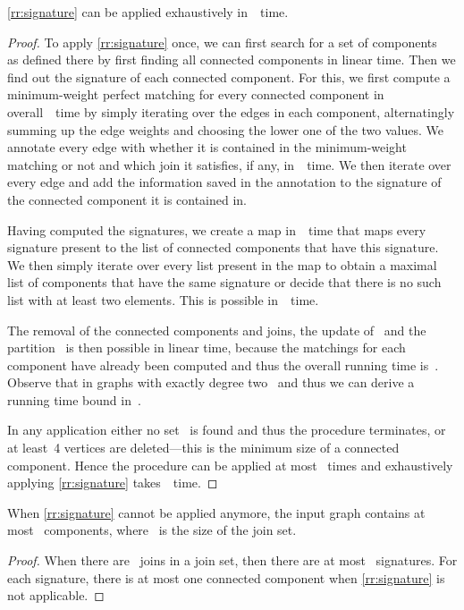 \begin{lemma}\label{lem:signatureruntime}
  \autoref{rr:signature} can be applied exhaustively in~~time.
\end{lemma}
\begin{proof}
  To apply \autoref{rr:signature} once, we can first search for a set of components~ as defined there by first finding all connected components in linear time. Then we find out the signature of each connected component. For this, we first compute a minimum-weight perfect matching for every connected component in overall~~time by simply iterating over the edges in each component, alternatingly summing up the edge weights and choosing the lower one of the two values. We annotate every edge with whether it is contained in the minimum-weight matching or not and which join it satisfies, if any, in~~time. We then iterate over every edge and add the information saved in the annotation to the signature of the connected component it is contained in. 

Having computed the signatures, we create a map in~~time that maps every signature present to the list of connected components that have this signature. We then simply iterate over every list present in the map to obtain a maximal list of components that have the same signature or decide that there is no such list with at least two elements. This is possible in~~time. 

The removal of the connected components and joins, the update of~ and the partition~ is then possible in linear time, because the matchings for each component have already been computed and thus the overall running time is~. Observe that in graphs with exactly degree two~ and thus we can derive a running time bound in~.
  
In any application either no set~ is found and thus the procedure terminates, or at least~4 vertices are deleted---this is the minimum size of a connected component. Hence the procedure can be applied at most~ times and exhaustively applying \autoref{rr:signature} takes~~time.
\end{proof}
\begin{observation}
  When \autoref{rr:signature} cannot be applied anymore, the input graph contains at most~ components, where~ is the size of the join set.
\end{observation}
\begin{proof}
  When there are~ joins in a join set, then there are at most~ signatures. For each signature, there is at most one connected component when \autoref{rr:signature} is not applicable.
\end{proof}

